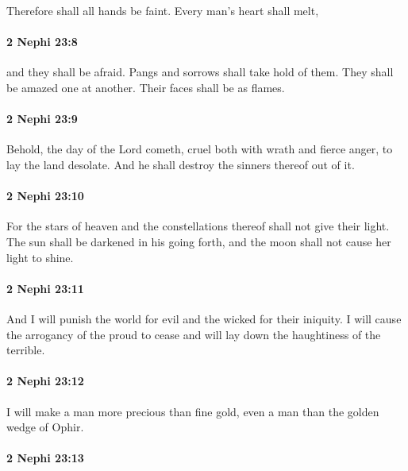			Therefore shall all hands be faint.
			Every man's heart shall melt,

		\paragraph{2 Nephi 23:8} %
			\label{2NEPHI-23-8}

			and they shall be afraid.
			Pangs and sorrows shall take hold of them.
			They shall be amazed one at another.
			Their faces shall be as flames.

		\paragraph{2 Nephi 23:9} %
			\label{2NEPHI-23-9}

			Behold, the day of the Lord cometh,
			cruel both with wrath and fierce anger,
			to lay the land desolate.
			And he shall destroy the sinners thereof out of it.

		\paragraph{2 Nephi 23:10} %
			\label{2NEPHI-23-10}

			For the stars of heaven and the constellations thereof shall not give their light.
			The sun shall be darkened in his going forth,
			and the moon shall not cause her light to shine.

		\paragraph{2 Nephi 23:11} %
			\label{2NEPHI-23-11}

			And I will punish the world for evil and the wicked for their iniquity.
			I will cause the arrogancy of the proud to cease
			and will lay down the haughtiness of the terrible.

		\paragraph{2 Nephi 23:12} %
			\label{2NEPHI-23-12}

			I will make a man more precious than fine gold,
			even a man than the golden wedge of Ophir.

		\paragraph{2 Nephi 23:13} %
			\label{2NEPHI-23-13}

